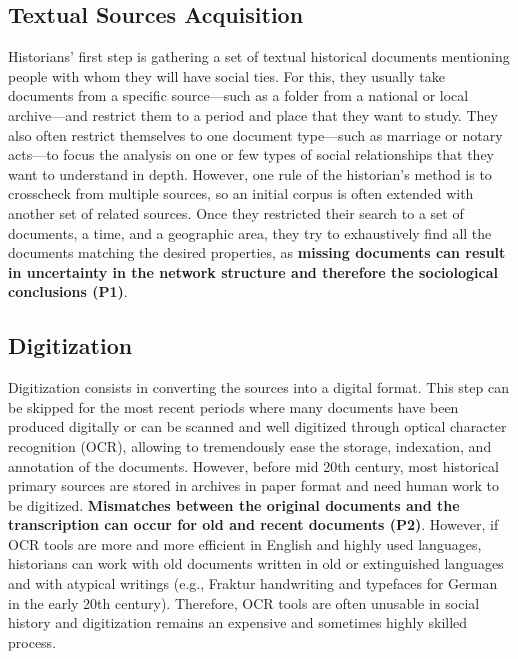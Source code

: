 \subsection{Textual Sources Acquisition}
Historians' first step is gathering a set of textual historical documents mentioning people with whom they will have social ties.
For this, they usually take documents from a specific source---such as a folder from a national or local archive---and restrict them to a period and place that they want to study.
They also often restrict themselves to one document type---such as marriage or notary acts---to focus the analysis on one or few types of social relationships that they want to understand in depth.
However, one rule of the historian's method is to crosscheck from multiple sources, so an initial corpus is often extended with another set of related sources.
Once they restricted their search to a set of documents, a time, and a geographic area, they try to exhaustively find all the documents matching the desired properties, as \textbf{missing documents can result in uncertainty in the network structure and therefore the sociological conclusions (P1)}.

\subsection{Digitization}
Digitization consists in converting the sources into a digital format.
This step can be skipped for the most recent periods where many documents have been produced digitally or can be scanned and well digitized through optical character recognition (OCR), allowing to tremendously ease the storage, indexation, and annotation of the documents.
However, before mid 20th century, most historical primary sources are stored in archives in paper format and need human work to be digitized.
\textbf{Mismatches between the original documents and the transcription can occur for old and recent documents (P2)}.
However, if OCR tools are more and more efficient in English and highly used languages, historians can work with old documents written in old or extinguished languages and with atypical writings (e.g., Fraktur handwriting and typefaces for German in the early 20th century).
Therefore, OCR tools are often unusable in social history and digitization remains an expensive and sometimes highly skilled process.

